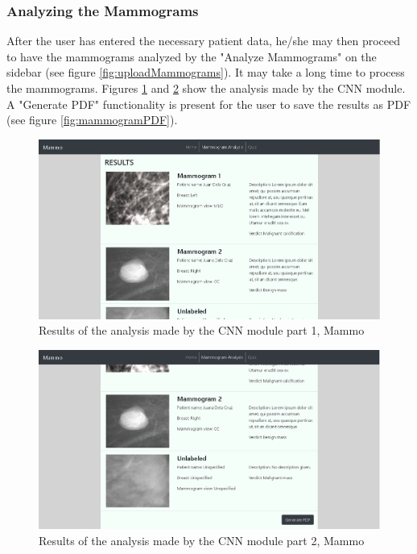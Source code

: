 \subsubsection{Analyzing the Mammograms}
	\qquad After the user has entered the necessary patient data, he/she may then proceed to have the mammograms analyzed by the "Analyze Mammograms" on the sidebar (see figure \ref{fig:uploadMammograms}). It may take a long time to process the mammograms. Figures \ref{fig:mammogramAnalysis1} and \ref{fig:mammogramAnalysis2} show the analysis made by the CNN module. A "Generate PDF" functionality is present for the user to save the results as PDF (see figure \ref{fig:mammogramPDF}).

\begin{figure}[h]
	\centering
  	\includegraphics[scale=0.5]{images/mammoAnalysis1.png}
	 \caption{Results of the analysis made by the CNN module part 1, Mammo}
  	\label{fig:mammogramAnalysis1}
\end{figure}

\begin{figure}[h]
	\centering
  	\includegraphics[scale=0.5]{images/mammoAnalysis2.png}
	 \caption{Results of the analysis made by the CNN module part 2, Mammo}
  	\label{fig:mammogramAnalysis2}
\end{figure}

